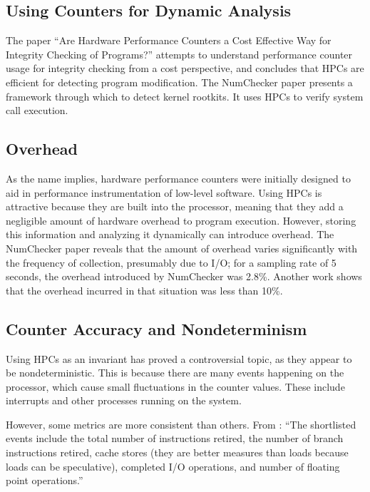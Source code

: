 \documentclass[notitlepage]{article}
\begin{document}
\subsection{Using Counters for Dynamic Analysis}
The paper ``Are Hardware Performance Counters a Cost Effective Way for Integrity
Checking of Programs?'' attempts to understand performance counter usage for
integrity checking from a cost perspective, and concludes that HPCs are
efficient for detecting program modification\cite{arehardware}. The
NumChecker\cite{numchecker} paper presents a framework through which to detect
kernel rootkits. It uses HPCs to verify system call execution.

\subsection{Overhead}
As the name implies, hardware performance counters were initially designed to
aid in performance instrumentation of low-level software. Using HPCs is
attractive because they are built into the processor, meaning that they add a
negligible amount of hardware overhead to program execution. However, storing
this information and analyzing it dynamically can introduce overhead. The
NumChecker\cite{numchecker} paper reveals that the amount of overhead varies
significantly with the frequency of collection,  presumably due to I/O; for a
sampling rate of 5 seconds, the overhead introduced by NumChecker was
2.8\%\cite{numchecker}. Another work shows that the overhead incurred in that
situation was less than 10\%\cite{arehardware}.

\subsection{Counter Accuracy and Nondeterminism}
Using HPCs as an invariant has proved a controversial topic, as they appear to
be nondeterministic. This is because there are many events happening on the
processor, which cause small fluctuations in the counter values. These include
interrupts and other processes running on the system.

However, some metrics are more consistent than others. From \cite{arehardware}:
``The shortlisted events include the total number of instructions retired, the
number of branch instructions retired, cache stores (they are better measures
than loads because loads can be speculative), completed I/O operations, and
number of floating point operations.''\cite{arehardware}
\end{document}

